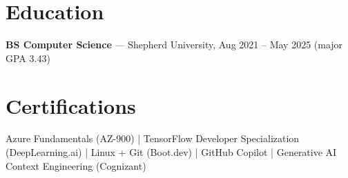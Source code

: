 \documentclass[10pt]{article}
\begin{document}
\section*{Education}
\noindent \textbf{BS Computer Science} — Shepherd University, Aug 2021 – May 2025 (major GPA 3.43)\par
\section*{Certifications}
\noindent Azure Fundamentals (AZ-900) | TensorFlow Developer Specialization (DeepLearning.ai) | Linux + Git (Boot.dev) | GitHub Copilot | Generative AI Context Engineering (Cognizant)\par
\end{document}
